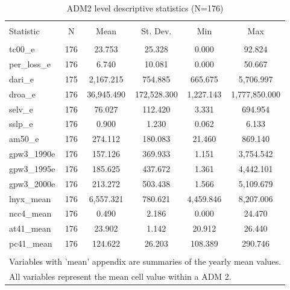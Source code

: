 \documentclass{article}\usepackage[]{graphicx}\usepackage[]{color}
\newenvironment{knitrout}{}{}  %
\begin{document}
\begin{knitrout}
\begin{table}[!htbp] \centering 
  \caption{ADM2 level descriptive statistics (N=176)} 
  \label{} 
\begin{tabular}{@{\extracolsep{5pt}}lccccc} 
\\[-1.8ex]\hline 
\hline \\[-1.8ex] 
Statistic & \multicolumn{1}{c}{N} & \multicolumn{1}{c}{Mean} & \multicolumn{1}{c}{St. Dev.} & \multicolumn{1}{c}{Min} & \multicolumn{1}{c}{Max} \\ 
\hline \\[-1.8ex] 
tc00\_e & 176 & 23.753 & 25.328 & 0.000 & 92.824 \\ 
per\_loss\_e & 176 & 6.740 & 10.081 & 0.000 & 50.667 \\ 
dari\_e & 175 & 2,167.215 & 754.885 & 665.675 & 5,706.997 \\ 
droa\_e & 176 & 36,945.490 & 172,528.300 & 1,227.143 & 1,777,850.000 \\ 
selv\_e & 176 & 76.027 & 112.420 & 3.331 & 694.954 \\ 
sslp\_e & 176 & 0.900 & 1.230 & 0.062 & 6.133 \\ 
am50\_e & 176 & 274.112 & 180.083 & 21.460 & 869.140 \\ 
gpw3\_1990e & 176 & 157.126 & 369.933 & 1.151 & 3,754.542 \\ 
gpw3\_1995e & 176 & 185.625 & 437.672 & 1.361 & 4,442.101 \\ 
gpw3\_2000e & 176 & 213.272 & 503.438 & 1.566 & 5,109.679 \\ 
lnyx\_mean & 176 & 6,557.321 & 780.621 & 4,459.846 & 8,207.006 \\ 
ncc4\_mean & 176 & 0.490 & 2.186 & 0.000 & 24.470 \\ 
at41\_mean & 176 & 23.902 & 1.142 & 20.912 & 26.440 \\ 
pc41\_mean & 176 & 124.622 & 26.203 & 108.389 & 290.746 \\ 
\hline \\[-1.8ex] 
\multicolumn{6}{l}{Variables with 'mean' appendix are summaries of the yearly mean values.} \\ 
\multicolumn{6}{l}{All variables represent the mean cell value within a ADM 2.} \\ 
\end{tabular} 
\end{table} 



\end{knitrout}
\end{document}
